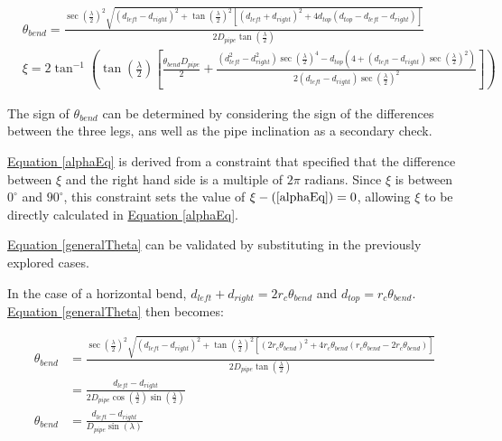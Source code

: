 \documentclass[11pt]{article}		%
\newcommand{\equationref}[1]{\hyperref[#1]{Equation \ref*{#1}}}     %
\begin{document}
			\fontsize{10}{\baselineskip}
			\begin{align}
				&\theta_{bend} = \frac{ \sec \left( \frac{\lambda}{2} \right)^2 \sqrt{ \left( d_{left} - d_{right} \right)^2 +  \tan \left( \frac{\lambda}{2} \right)^2 \left[ \left( d_{left} + d_{right} \right)^2 + 4 d_{top} \left( d_{top} - d_{left} - d_{right} \right) \right] } }{2 D_{pipe} \tan \left( \frac{\lambda}{2} \right)} \label{generalTheta}
				\\
				&\xi = 2 \tan^{-1} \left( \tan \left( \frac{\lambda}{2} \right) \left[\frac{ \theta_{bend} D_{pipe}}{2} + \frac{\left( d_{left}^2 - d_{right}^2 \right) \sec \left( \frac{\lambda}{2} \right)^4 - d_{top} \left(4 + \left( d_{left} - d_{right} \right) \sec \left( \frac{\lambda}{2} \right)^2 \right)}{2 \left( d_{left} - d_{right} \right) \sec \left( \frac{\lambda}{2} \right)^2} \right] \right) \label{alphaEq}
			\end{align}
			\fontsize{11}{\baselineskip}
			
			The sign of $\theta_{bend}$ can be determined by considering the sign of the differences between the three legs, ans well as the pipe inclination as a secondary check.
			
			\equationref{alphaEq} is derived from a constraint that specified that the difference between $\xi$ and the right hand side is a multiple of $2 \pi$ radians.
			Since $\xi$ is between $0^\circ$ and $90^\circ$, this constraint sets the value of $\xi - (\ref*{alphaEq}) = 0$, allowing $\xi$ to be directly calculated in \equationref{alphaEq}.
			
			\equationref{generalTheta} can be validated by substituting in the previously explored cases.
			
			In the case of a horizontal bend, $d_{left} + d_{right} = 2 r_c \theta_{bend} $ and $d_{top} = r_c \theta_{bend}$.
			\equationref{generalTheta} then becomes:
			
			\begin{align*}
				\theta_{bend} &= \frac{ \sec \left( \frac{\lambda}{2} \right)^2 \sqrt{ \left( d_{left} - d_{right} \right)^2 +  \tan \left( \frac{\lambda}{2} \right)^2 \left[ \left( 2 r_c \theta_{bend} \right)^2 + 4 r_c \theta_{bend} \left( r_c \theta_{bend}  - 2 r_c \theta_{bend} \right) \right] } }{2 D_{pipe} \tan \left( \frac{\lambda}{2} \right)}
				\\
				&= \frac{d_{left} - d_{right}}{2 D_{pipe} \cos \left( \frac{\lambda}{2} \right) \sin \left( \frac{\lambda}{2} \right)}
				\\
				\theta_{bend} &= \frac{d_{left} - d_{right}}{D_{pipe} \sin \left( \lambda \right)}
			\end{align*}
			
\end{document}
